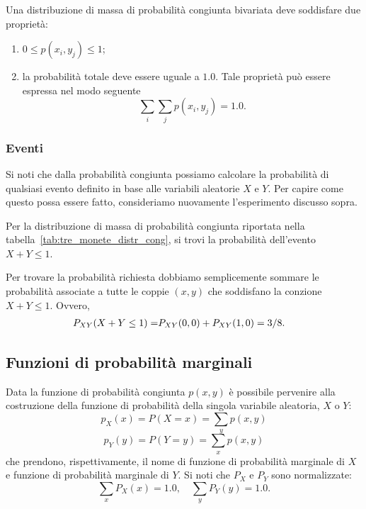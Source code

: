 Una distribuzione di massa di probabilità congiunta bivariata deve soddisfare due proprietà:
\begin{enumerate}[label=(\alph*)]
\item $0 \leq p(x_i, y_j) \leq 1$;
\item la probabilità totale deve essere uguale a $1.0$. 
Tale proprietà può essere espressa nel modo seguente
\[
\sum_{i} \sum_{j} p(x_i, y_j) = 1.0.
\]
\end{enumerate}

\subsubsection{Eventi}

Si noti che dalla probabilità congiunta possiamo calcolare la probabilità di qualsiasi evento definito in base alle variabili aleatorie $X$ e $Y$. 
Per capire come questo possa essere fatto, consideriamo nuovamente l'esperimento discusso sopra. 
\begin{exmp}
Per la distribuzione di massa di probabilità congiunta riportata nella tabella~\ref{tab:tre_monete_distr_cong}, si trovi la probabilità dell'evento $X+Y \leq 1$.
\end{exmp}
\begin{solu}
Per trovare la probabilità richiesta dobbiamo semplicemente sommare le probabilità associate a tutte le coppie $(x,y)$ che soddisfano la conzione $X+Y \leq 1$. 
Ovvero,
\begin{align}
P_{XY}(X+Y \leq 1) = &P_{XY}(0, 0) + P_{XY}(1, 0)= 3/8.\notag
\end{align}
\end{solu}

\subsection{Funzioni di probabilità marginali}

Data la funzione di probabilità congiunta $p(x, y)$ è possibile pervenire alla costruzione della funzione di probabilità della singola variabile aleatoria, $X$ o $Y$: 
\[
p_X(x) = P(X = x) = \sum_y p(x,y)
\]
\[
p_Y(y) = P(Y = y) = \sum_x p(x,y)
\]
che prendono, rispettivamente, il nome di funzione di probabilità marginale di $X$ e funzione di probabilità marginale di $Y$.
Si noti che $P_X$ e $P_Y$ sono normalizzate:
\[
\sum_x P_X(x) = 1.0, \quad \sum_y P_Y(y) = 1.0.
\]

